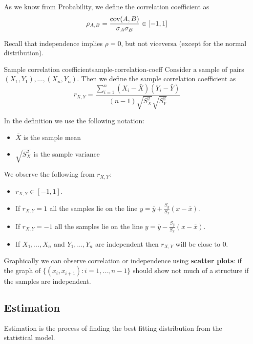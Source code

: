 \documentclass[12pt]{extarticle}
\newcommand{\cov}{{\operatorfont cov}}
\begin{document}
As we know from Probability, we define the correlation coefficient as
\begin{equation}
    \rho_{A,B} = \frac{\cov(A, B)}{\sigma_A \sigma_B} \in [-1, 1]
\end{equation}

Recall that independence implies $\rho = 0$, but not viceversa (except for the normal distribution).

\begin{definition}{Sample correlation coefficient}{sample-correlation-coeff}
    Consider a sample of pairs $(X_1, Y_1), \dots, (X_n, Y_n)$.
    Then we define the sample correlation coefficient as
    \begin{equation}
        r_{X, Y} = \frac{\sum^n_{i = 1} (X_i - \bar{X})(Y_i - \bar{Y})}{(n-1)\sqrt{S^2_X} \sqrt{S^2_Y}}
    \end{equation}
\end{definition}

In the definition we use the following notation:
\begin{itemize}
    \item $\bar X$ is the sample mean
    \item $\sqrt{S^2_X}$ is the sample variance
\end{itemize}

We observe the following from $r_{X, Y}$:
\begin{itemize}
    \item $r_{X, Y} \in [-1, 1]$.
    \item If $r_{X, Y} = 1$ all the samples lie on the line $y = \bar y + \frac{S_y}{S_x}(x-\bar x)$.
    \item If $r_{X, Y} = -1$ all the samples lie on the line $y = \bar y - \frac{S_y}{S_x}(x-\bar x)$.
    \item If $X_1, \dots, X_n$ and $Y_1, \dots, Y_n$ are independent then $r_{X, Y}$ will be close to $0$.
\end{itemize}

Graphically we can observe correlation or independence using \textbf{scatter plots}: if the graph of $\{ (x_i, x_{i+1}) : i = 1, \dots, n-1 \}$ should show not much of a structure if the samples are independent.

\subsection{Estimation}

Estimation is the process of finding the best fitting distribution from the statistical model.
\end{document}
